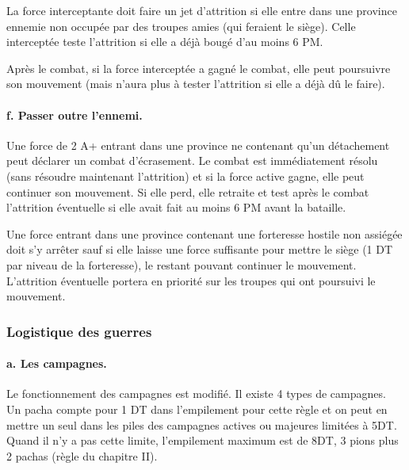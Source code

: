 La force interceptante doit faire un jet d'attrition si elle entre dans
une province ennemie non occupée par des troupes amies (qui 
feraient le siège). Celle interceptée teste l'attrition si elle a déjà
bougé d'au moins 6 PM. 

Après le combat, si la force interceptée a gagné le combat, elle peut
poursuivre son mouvement (mais n'aura plus à tester l'attrition si
elle a déjà dû le faire).


\paragraph{f. Passer outre l'ennemi.}
Une force de 2 A+ entrant dans une province ne contenant qu'un détachement
peut déclarer un combat d'écrasement. Le combat est immédiatement
résolu (sans résoudre maintenant l'attrition) et si la force active gagne, 
elle peut continuer son mouvement. Si elle perd, elle retraite et test après le
combat l'attrition éventuelle si elle avait fait au moins 6 PM avant la
bataille.

Une force entrant dans une province contenant une forteresse hostile
non assiégée doit s'y arrêter sauf si elle laisse une force suffisante
pour mettre le siège (1 DT par niveau de la forteresse), le restant
pouvant continuer le mouvement. L'attrition éventuelle portera
en priorité sur les troupes qui ont poursuivi le mouvement.


\subsubsection{Logistique des guerres}

\paragraph{a. Les campagnes.}
Le fonctionnement des campagnes est modifié. Il existe 
4 types de campagnes. \\



Un pacha compte pour 1 DT dans l'empilement pour cette règle et
on peut en mettre un seul dans les piles des campagnes actives ou
majeures limitées à 5DT. Quand il n'y a pas cette limite, l'empilement
maximum est de 8DT, 3 pions plus 2 pachas (règle du chapitre II).

